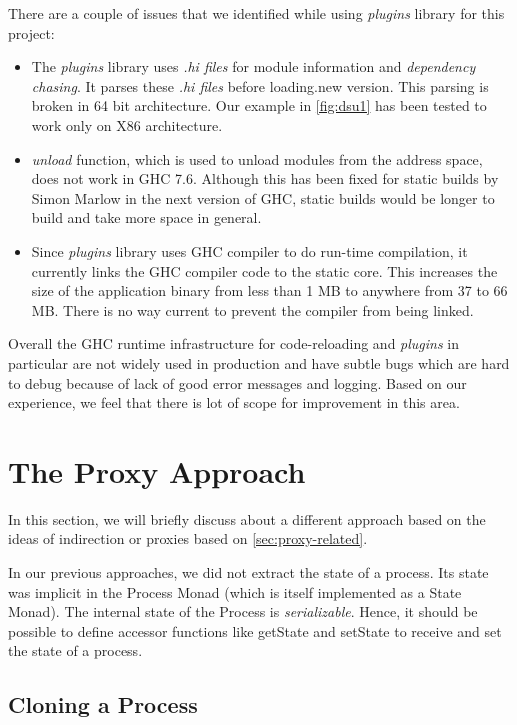 There are a couple of issues that we identified while using \emph{plugins}
library for this project:

\begin{itemize}
\item The \emph{plugins} library uses \emph{.hi files} for module
  information and \emph{dependency chasing}. It parses these \emph{.hi
    files} before loading.new version. This parsing is broken in 64
  bit architecture. Our example in \ref{fig:dsu1} has been tested to
  work only on X86 architecture.
\item \emph{unload} function, which is used to unload modules from the
  address space, does not work in GHC 7.6. Although this has been
  fixed for static builds by Simon Marlow in the next version of GHC,
  static builds would be longer to build and take more space in general.
\item Since \emph{plugins} library uses GHC compiler to do run-time
  compilation, it currently links the GHC compiler code to the static
  core. This increases the size of the application binary from less
  than 1 MB to anywhere from 37 to 66 MB. There is no way current to
  prevent the compiler from being linked.
\end{itemize}

Overall the GHC runtime infrastructure for code-reloading and
\emph{plugins} in particular are not widely used in production and
have subtle bugs which are hard to debug because of lack of good error
messages and logging. Based on our experience, we feel that there is
lot of scope for improvement in this area.


\section{The Proxy Approach}
\label{sec:proxy-approach}

In this section, we will briefly discuss about a different approach
based on the ideas of indirection or proxies based on
\autoref{sec:proxy-related}.

In our previous approaches, we did not
extract the state of a process. Its state was implicit in the Process
Monad (which is itself implemented as a State Monad). The internal
state of the Process is \emph{serializable}. Hence, it should be
possible to define accessor functions like getState and setState to
receive and set the state of a process.

\subsection{Cloning a Process}

